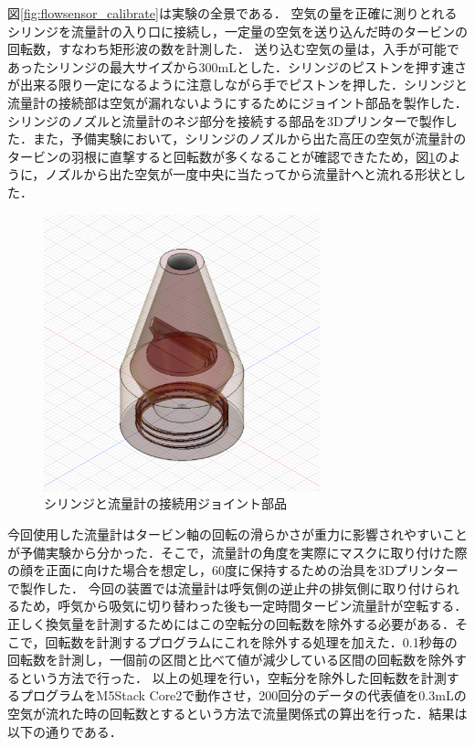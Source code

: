 図\ref{fig:flowsensor_calibrate}は実験の全景である．
空気の量を正確に測りとれるシリンジを流量計の入り口に接続し，一定量の空気を送り込んだ時のタービンの回転数，すなわち矩形波の数を計測した．
送り込む空気の量は，入手が可能であったシリンジの最大サイズから300mLとした．シリンジのピストンを押す速さが出来る限り一定になるように注意しながら手でピストンを押した．シリンジと流量計の接続部は空気が漏れないようにするためにジョイント部品を製作した．シリンジのノズルと流量計のネジ部分を接続する部品を3Dプリンターで製作した．また，予備実験において，シリンジのノズルから出た高圧の空気が流量計のタービンの羽根に直撃すると回転数が多くなることが確認できたため，図\ref{fig:syringe_cone}のように，ノズルから出た空気が一度中央に当たってから流量計へと流れる形状とした．

\begin{figure}[h]
  \begin{center}
    \includegraphics[width=8cm]{fig/syringe_cone}
    \caption{シリンジと流量計の接続用ジョイント部品}
    \label{fig:syringe_cone}
  \end{center}
\end{figure}

今回使用した流量計はタービン軸の回転の滑らかさが重力に影響されやすいことが予備実験から分かった．そこで，流量計の角度を実際にマスクに取り付けた際の顔を正面に向けた場合を想定し，60度に保持するための治具を3Dプリンターで製作した．
今回の装置では流量計は呼気側の逆止弁の排気側に取り付けられるため，呼気から吸気に切り替わった後も一定時間タービン流量計が空転する．正しく換気量を計測するためにはこの空転分の回転数を除外する必要がある．そこで，回転数を計測するプログラムにこれを除外する処理を加えた．0.1秒毎の回転数を計測し，一個前の区間と比べて値が減少している区間の回転数を除外するという方法で行った．
以上の処理を行い，空転分を除外した回転数を計測するプログラムをM5Stack Core2で動作させ，200回分のデータの代表値を0.3mLの空気が流れた時の回転数とするという方法で流量関係式の算出を行った．結果は以下の通りである．

